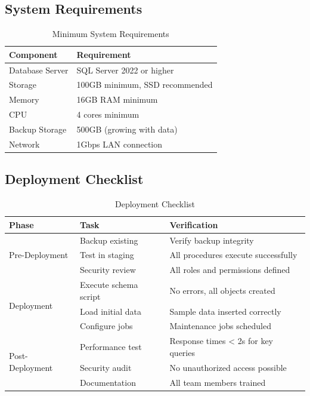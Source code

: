 \documentclass[11pt,a4paper]{article}
\begin{document}
\subsection{System Requirements}
\begin{table}[H]
    \centering
    \begin{tabular}{|l|l|}
        \hline
        \rowcolor{tableheader}
        \textbf{Component} & \textbf{Requirement} \\
        \hline
        Database Server & SQL Server 2022 or higher \\
        \hline
        Storage & 100GB minimum, SSD recommended \\
        \hline
        Memory & 16GB RAM minimum \\
        \hline
        CPU & 4 cores minimum \\
        \hline
        Backup Storage & 500GB (growing with data) \\
        \hline
        Network & 1Gbps LAN connection \\
        \hline
    \end{tabular}
    \caption{Minimum System Requirements}
\end{table}

\subsection{Deployment Checklist}
\begin{table}[H]
    \centering
    \begin{tabular}{|l|l|p{7cm}|}
        \hline
        \rowcolor{tableheader}
        \textbf{Phase} & \textbf{Task} & \textbf{Verification} \\
        \hline
        \multirow{3}{*}{Pre-Deployment} & Backup existing & Verify backup integrity \\
        \cline{2-3}
        & Test in staging & All procedures execute successfully \\
        \cline{2-3}
        & Security review & All roles and permissions defined \\
        \hline
        
        \multirow{3}{*}{Deployment} & Execute schema script & No errors, all objects created \\
        \cline{2-3}
        & Load initial data & Sample data inserted correctly \\
        \cline{2-3}
        & Configure jobs & Maintenance jobs scheduled \\
        \hline
        
        \multirow{3}{*}{Post-Deployment} & Performance test & Response times < 2s for key queries \\
        \cline{2-3}
        & Security audit & No unauthorized access possible \\
        \cline{2-3}
        & Documentation & All team members trained \\
        \hline
    \end{tabular}
    \caption{Deployment Checklist}
\end{table}
\end{document}
